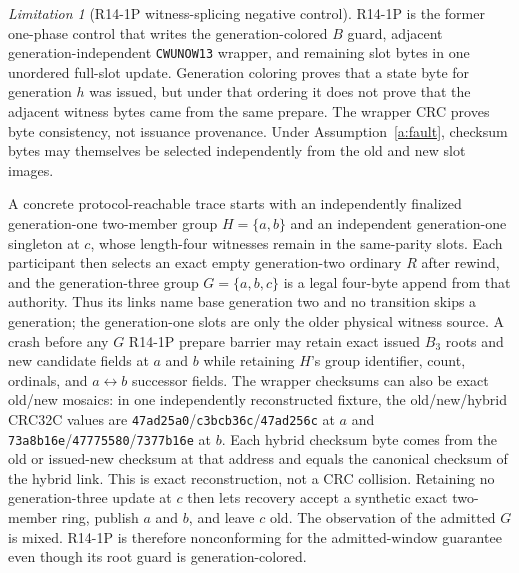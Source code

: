 \documentclass[10pt,twocolumn]{article}
\theoremstyle{remark}
\newtheorem{limitation}{Limitation}
\newcommand{\code}[1]{\texttt{#1}}
\begin{document}
\begin{limitation}[R14-1P witness-splicing negative control]\label{l:witness-provenance}
R14-1P is the former one-phase control that writes the generation-colored $B$ guard, adjacent
generation-independent \code{CWUNOW13} wrapper, and remaining slot bytes in one unordered
full-slot update. Generation coloring proves that a state byte for generation $h$ was issued, but
under that ordering it does not prove that the adjacent witness bytes came from the same prepare.
The wrapper CRC proves byte consistency, not issuance provenance. Under Assumption~\ref{a:fault},
checksum bytes may themselves be selected independently from the old and new slot images.

A concrete protocol-reachable trace starts with an independently finalized generation-one
two-member group $H=\{a,b\}$ and an independent generation-one singleton at $c$, whose length-four
witnesses remain in the same-parity slots. Each
participant then selects an exact empty generation-two ordinary $R$ after rewind, and the
generation-three group $G=\{a,b,c\}$ is a legal four-byte append from that authority. Thus its
links name base generation two and no transition skips a generation; the generation-one slots are
only the older physical witness source. A crash before
any $G$ R14-1P prepare barrier may retain exact issued $B_3$ roots and new candidate fields at $a$ and $b$
while retaining $H$'s group identifier, count, ordinals, and $a\leftrightarrow b$ successor fields.
The wrapper checksums can also be exact old/new mosaics: in one independently reconstructed fixture,
the old/new/hybrid CRC32C values are \code{47ad25a0}/\code{c3bcb36c}/\code{47ad256c} at $a$ and
\code{73a8b16e}/\code{47775580}/\code{7377b16e} at $b$. Each hybrid checksum byte comes from the
old or issued-new checksum at that address and equals the canonical checksum of the hybrid link.
This is exact reconstruction, not a CRC collision. Retaining no generation-three update at $c$
then lets recovery accept a synthetic exact two-member ring, publish $a$ and $b$, and leave $c$
old. The observation of the admitted $G$ is mixed. R14-1P is therefore nonconforming for the
admitted-window guarantee even though its root guard is generation-colored.


\end{limitation}
\end{document}

